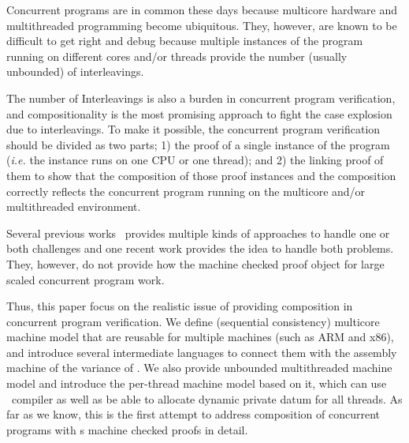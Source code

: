 Concurrent programs are in common these days because 
multicore hardware and multithreaded programming become 
ubiquitous. 
They, however, are known to be difficult to get right 
and debug 
because multiple instances of 
the program running on different cores and/or threads 
provide the number (usually unbounded) of interleavings. 

The number of Interleavings is also a burden in
concurrent program verification,
and 
compositionality is the most promising approach to fight 
the case explosion due to interleavings.
To make it possible, 
the concurrent program verification should 
be divided as two parts;
1) the proof of a single instance of the program 
 (\textit{i.e.} the instance runs on one CPU or one thread);
 and 2) 
 the linking proof of them to show 
that the composition of those proof instances and  
the composition correctly reflects 
the concurrent program running on the 
multicore and/or multithreaded environment.

Several previous works~ 
provides multiple kinds of approaches to handle 
one or both challenges 
and one recent work 
provides the idea 
to handle both problems.
They, however, 
do not provide 
how 
the machine checked proof object 
for large scaled concurrent program 
work. 

Thus, this paper focus on the realistic issue of 
providing composition in concurrent program verification. 
We define (sequential consistency) multicore machine model that are reusable for multiple 
machines (such as ARM and x86), 
and introduce several intermediate languages 
to connect them with the assembly machine of the variance of  \compcertkwd .
We also provide unbounded multithreaded machine model and introduce the per-thread machine model 
based on it, which can use \compcertkwd \ compiler as well as be able to allocate 
dynamic private datum for all threads.
As far as we know, this is the first attempt to address composition of concurrent programs with s
machine checked proofs in detail. 


%
%
%
%








